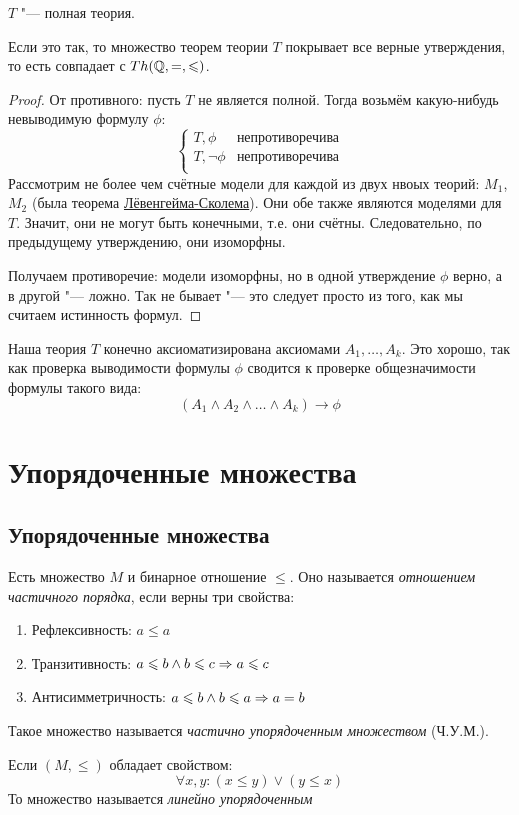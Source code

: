 \begin{assertion}
	$T$ "--- полная теория.
\end{assertion}
\begin{Rem}
	Если это так, то множество теорем теории $T$ покрывает все верные утверждения,
	то есть совпадает с $Th(\mathbb{Q}, =, \leqslant)$.
\end{Rem}
\begin{proof}
	От противного: пусть $T$ не является полной.
	Тогда возьмём какую-нибудь невыводимую формулу $\phi$:
	\[
		\begin{cases}
			T, \phi & \text{непротиворечива} \\
			T, \lnot\phi & \text{непротиворечива} \\
		\end{cases}
	\]
	Рассмотрим не более чем счётные модели для каждой из двух нвоых теорий: $M_1$, $M_2$
	(была теорема \hyperref[lowenheim]{Лёвенгейма-Сколема}).
	Они обе также являются моделями для $T$.
	Значит, они не могут быть конечными, т.е. они счётны.
	Следовательно, по предыдущему утверждению, они изоморфны.

	Получаем противоречие: модели изоморфны, но в одной утверждение $\phi$ верно,
	а в другой "--- ложно.
	Так не бывает "--- это следует просто из того, как мы считаем истинность формул.
\end{proof}

\begin{Rem}
	Наша теория $T$ конечно аксиоматизирована аксиомами $A_1, \dots, A_k$.
	Это хорошо, так как проверка выводимости формулы $\phi$ сводится к проверке
	общезначимости формулы такого вида:
	\[ (A_1 \land A_2 \land \dots \land A_k) \to \phi \]
\end{Rem}

\chapter{Упорядоченные множества}
\section{Упорядоченные множества}
\begin{Def}
	Есть множество $M$ и бинарное отношение $\le$.
	Оно называется \textit{отношением частичного порядка}, если верны три свойства:
	\begin{enumerate}
		\item Рефлексивность: $a \le a$ 
		\item Транзитивность: $a \leqslant b \land b \leqslant c \Rightarrow a \leqslant c$
		\item Антисимметричность: $a \leqslant b \land b \leqslant a \Rightarrow a = b$
	\end{enumerate}
	Такое множество называется \textit{частично упорядоченным множеством} (Ч.У.М.).
\end{Def}
\begin{Def}
	Если $(M, \le)$ обладает свойством:
	\[ \forall x, y \colon (x \le y) \lor (y \le x) \]
	То множество называется \textit{линейно упорядоченным}
\end{Def}

